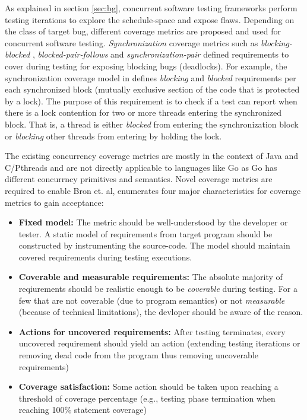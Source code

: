 As explained in section \ref{sec:bg}, concurrent software testing frameworks perform testing iterations to explore the schedule-space and expose flaws.
%
Depending on the class of target bug, different coverage metrics are proposed and used for concurrent software testing.
%
\textit{Synchronization} coverage metrics such as \textit{blocking-blocked} \cite{edelstein2003contest}, \textit{blocked-pair-follows} \cite{trainin-followsCoverage-padtad09} and \textit{synchronization-pair} \cite{hong-syncTesting-issta12} defined requirements to cover during testing for exposing blocking bugs (\eg deadlocks).
%
%
For example, the synchronization coverage model in \cite{edelstein2003contest} defines \textit{blocking} and \textit{blocked} requirements per each synchronized block (\ie mutually exclusive section of the code that is protected by a lock).
%
The purpose of this requirement is to check if a test can report when there is a lock contention for two or more threads entering the synchronized block.
%
That is, a thread is either \textit{blocked} from entering the synchronization block or \textit{blocking} other threads from entering by holding the lock.
%

The existing concurrency coverage metrics are mostly in the context of Java and C/Pthreads and are not directly applicable to languages like Go as Go has different concurrncy primitives and semantics.
%
Novel coverage metrics are required to enable
%
Bron et. al,\cite{bron-appSyncCov-ppopp05} enumerates four major characteristics for coverage metrics to gain acceptance:
\begin{itemize}
  \item \textbf{Fixed model:} The metric should be well-understood by the developer or tester. A static model of requirements from target program should be constructed by instrumenting the source-code. The model should maintain covered requirements during testing executions.
  \item \textbf{Coverable and measurable requirements:} The absolute majority of reqiurements should be realistic enough to be \textit{coverable} during testing. For a few that are not coverable (due to program semantics) or not \textit{measurable} (because of technical limitations), the devloper should be aware of the reason.
  \item \textbf{Actions for uncovered requirements:} After testing terminates, every uncovered requirement should yield an action (\eg extending testing iterations or removing dead code from the program thus removing uncoverable requirements)
  \item \textbf{Coverage satisfaction:} Some action should be taken upon reaching a threshold of coverage percentage (e.g., testing phase termination when reaching 100\% statement coverage)
\end{itemize}

